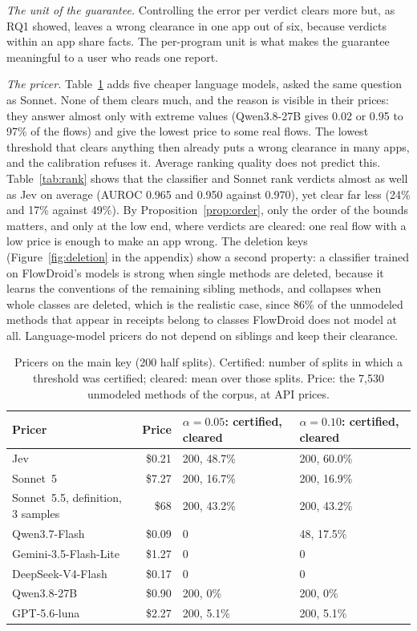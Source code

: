 \emph{The unit of the guarantee.}
Controlling the error per verdict clears more but, as RQ1 showed, leaves a wrong clearance in one app out of six, because verdicts within an app share facts.
The per-program unit is what makes the guarantee meaningful to a user who reads one report.

\emph{The pricer.}
Table~\ref{tab:panel} adds five cheaper language models, asked the same question as Sonnet.
None of them clears much, and the reason is visible in their prices: they answer almost only with extreme values (Qwen3.8-27B gives 0.02 or 0.95 to 97\% of the flows) and give the lowest price to some real flows.
The lowest threshold that clears anything then already puts a wrong clearance in many apps, and the calibration refuses it.
Average ranking quality does not predict this.
Table~\ref{tab:rank} shows that the classifier and Sonnet rank verdicts almost as well as Jev on average (AUROC 0.965 and 0.950 against 0.970), yet clear far less (24\% and 17\% against 49\%).
By Proposition~\ref{prop:order}, only the order of the bounds matters, and only at the low end, where verdicts are cleared: one real flow with a low price is enough to make an app wrong.
The deletion keys (Figure~\ref{fig:deletion} in the appendix) show a second property: a classifier trained on FlowDroid's models is strong when single methods are deleted, because it learns the conventions of the remaining sibling methods, and collapses when whole classes are deleted, which is the realistic case, since 86\% of the unmodeled methods that appear in receipts belong to classes FlowDroid does not model at all.
Language-model pricers do not depend on siblings and keep their clearance.

\begin{table}[t]
\caption{Pricers on the main key (200 half splits). Certified: number of splits in which a threshold was certified; cleared: mean over those splits. Price: the 7{,}530 unmodeled methods of the corpus, at API prices.}
\label{tab:panel}
\small
\begin{tabular}{@{}lrll@{}}
\toprule
Pricer & Price & $\alpha=0.05$: certified, cleared & $\alpha=0.10$: certified, cleared\\
\midrule
Jev & \$0.21 & 200, 48.7\% & 200, 60.0\%\\
Sonnet~5 & \$7.27 & 200, 16.7\% & 200, 16.9\%\\
Sonnet~5.5, definition, 3 samples & \$68 & 200, 43.2\% & 200, 43.2\%\\
Qwen3.7-Flash & \$0.09 & 0 & 48, 17.5\%\\
Gemini-3.5-Flash-Lite & \$1.27 & 0 & 0\\
DeepSeek-V4-Flash & \$0.17 & 0 & 0\\
Qwen3.8-27B & \$0.90 & 200, 0\% & 200, 0\%\\
GPT-5.6-luna & \$2.27 & 200, 5.1\% & 200, 5.1\%\\
\bottomrule
\end{tabular}
\end{table}

